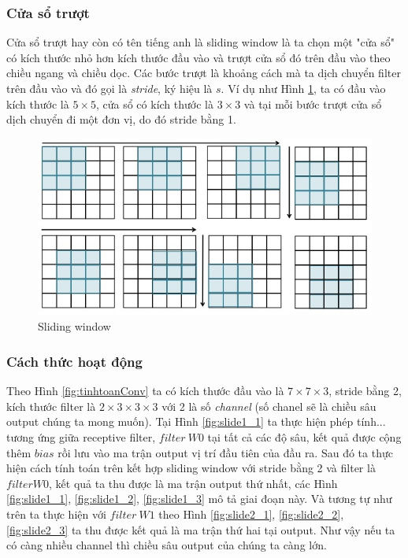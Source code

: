 \subsubsection{Cửa sổ trượt}
  Cửa sổ trượt hay còn có tên tiếng anh là sliding window là ta chọn một "cửa sổ" có kích thước nhỏ hơn kích thước đầu vào và trượt cửa sổ đó trên đầu vào theo chiều ngang và chiều dọc. Các bước trượt là khoảng cách mà ta dịch chuyển filter trên đầu vào và đó gọi là \textit{stride}, ký hiệu là $s$. Ví dụ như Hình \ref{fig:slidingwindow}, ta có đầu vào kích thước là $5\times5$, cửa sổ có kích thước là $3\times3$ và tại mỗi bước trượt cửa sổ dịch chuyển đi một đơn vị, do đó stride bằng 1.
\begin{center}
\begin{figure}[htp]
	\begin{center}
		\includegraphics[scale=1]{chap3/image/cnn/slidingwindow.jpg}
	\end{center}
	\caption{Sliding window}
	\label{fig:slidingwindow}
\end{figure}
\end{center}
\subsubsection{Cách thức hoạt động}
Theo Hình \ref{fig:tinhtoanConv} ta có kích thước đầu vào là $7 \times 7\times 3$, stride bằng 2, kích thước filter là  $2\times 3\times 3 \times 3$ với 2 là số \textit{channel} (số chanel sẽ là chiều sâu output chúng ta mong muốn). Tại Hình \ref{fig:slide1_1} ta  thực hiện phép tính... tương ứng giữa receptive filter, $filter ~W0$ tại tất cả các độ sâu, kết quả được cộng thêm $bias$ rồi lưu vào ma trận output vị trí đầu tiên của đầu ra. Sau đó ta thực hiện cách tính toán trên kết hợp sliding window với stride bằng 2 và filter là $filter W0$, kết quả ta thu được là ma trận output thứ nhất, các Hình \ref{fig:slide1_1}, \ref{fig:slide1_2}, \ref{fig:slide1_3} mô tả giai đoạn này. Và tương tự như trên ta thực hiện với $filter ~W1$ theo Hình \ref{fig:slide2_1}, \ref{fig:slide2_2}, \ref{fig:slide2_3} ta thu được kết quả là ma trận thứ hai tại output. Như vậy nếu ta có càng nhiều channel thì chiều sâu output của chúng ta càng lớn. \par

